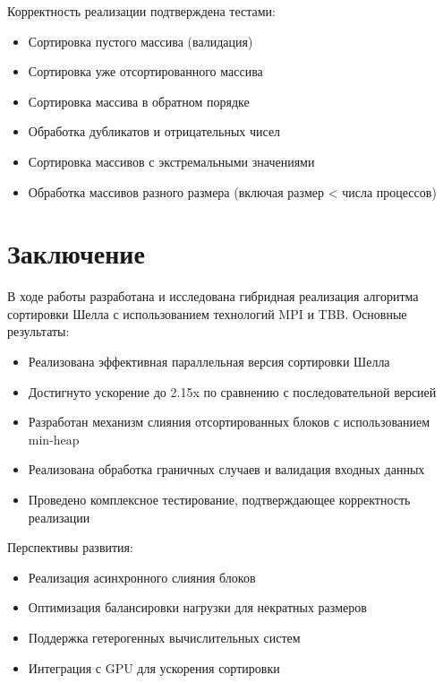 \documentclass[a4paper,12pt]{article}
\begin{document}
Корректность реализации подтверждена тестами:
\begin{itemize}
    \item Сортировка пустого массива (валидация)
    \item Сортировка уже отсортированного массива
    \item Сортировка массива в обратном порядке
    \item Обработка дубликатов и отрицательных чисел
    \item Сортировка массивов с экстремальными значениями
    \item Обработка массивов разного размера (включая размер < числа процессов)
\end{itemize}

\section*{Заключение}
В ходе работы разработана и исследована гибридная реализация алгоритма сортировки Шелла с использованием технологий MPI и TBB. Основные результаты:

\begin{itemize}
    \item Реализована эффективная параллельная версия сортировки Шелла
    \item Достигнуто ускорение до 2.15x по сравнению с последовательной версией
    \item Разработан механизм слияния отсортированных блоков с использованием min-heap
    \item Реализована обработка граничных случаев и валидация входных данных
    \item Проведено комплексное тестирование, подтверждающее корректность реализации
\end{itemize}

Перспективы развития:
\begin{itemize}
    \item Реализация асинхронного слияния блоков
    \item Оптимизация балансировки нагрузки для некратных размеров
    \item Поддержка гетерогенных вычислительных систем
    \item Интеграция с GPU для ускорения сортировки
\end{itemize}
\end{document}
